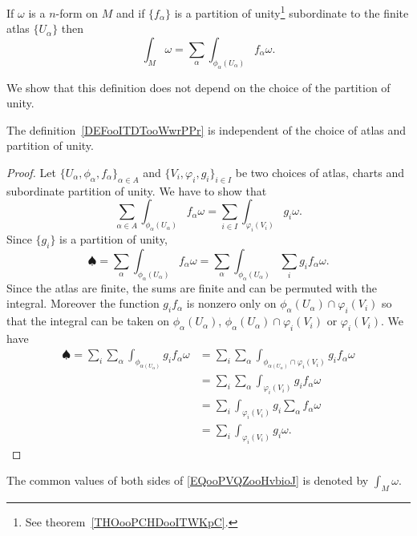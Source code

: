 \begin{definition}      \label{DEFooITDTooWwrPPr}
	If \( \omega\) is a \( n\)-form on \( M\) and if \( \{ f_{\alpha} \} \) is a partition of unity\footnote{See theorem~\ref{THOooPCHDooITWKpC}.} subordinate to the finite atlas \( \{ U_{\alpha} \}\) then
	\begin{equation}
		\int_M\omega=\sum_{\alpha}\int_{\phi_{\alpha}(U_{\alpha})}f_{\alpha}\omega.
	\end{equation}
\end{definition}

We show that this definition does not depend on the choice of the partition of unity.
\begin{lemma} \label{LEMooCMIZooHhHaHV}
	The definition~\ref{DEFooITDTooWwrPPr} is independent of the choice of atlas and partition of unity.
\end{lemma}

\begin{proof}
	Let \(  \{ U_{\alpha},\phi_{\alpha},f_{\alpha} \}_{\alpha\in A}  \) and \( \{ V_i,\varphi_i,g_i \}_{i\in I}\) be two choices of atlas, charts and subordinate partition of unity. We have to show that
	\begin{equation}        \label{EQooPVQZooHvbioJ}
		\sum_{\alpha\in A}\int_{\phi_{\alpha}(U_{\alpha})}f_{\alpha}\omega=\sum_{i\in I}\int_{\varphi_i(V_i)}g_i\omega.
	\end{equation}
	Since \( \{ g_i \}\) is a partition of unity,
	\begin{equation}
		\spadesuit=\sum_{\alpha}\int_{\phi_{\alpha}(U_{\alpha})}f_{\alpha}\omega=\sum_{\alpha}\int_{\phi_{\alpha}(U_{\alpha})}\sum_ig_if_{\alpha}\omega.
	\end{equation}
	Since the atlas are finite, the sums are finite and can be permuted with the integral. Moreover the function \( g_if_{\alpha}\) is nonzero only on \( \phi_{\alpha}(U_{\alpha})\cap\varphi_i(V_i)\) so that the integral can be taken on \( \phi_{\alpha}(U_{\alpha})\), \( \phi_{\alpha}(U_{\alpha})\cap\varphi_i(V_i)\) or \( \varphi_i(V_i)\). We have
	\begin{subequations}
		\begin{align}
			\spadesuit=\sum_i\sum_{\alpha}\int_{\phi_{\alpha(U_{\alpha})}}g_if_{\alpha}\omega & =  \sum_i\sum_{\alpha}\int_{\phi_{\alpha(U_{\alpha})}\cap \varphi_i(V_i)}g_if_{\alpha}\omega \\
			                                                                                  & =  \sum_i\sum_{\alpha}\int_{\varphi_i(V_i)}g_if_{\alpha}\omega                               \\
			                                                                                  & = \sum_i\int_{\varphi_i(V_i)}g_i\sum_{\alpha}f_{\alpha}\omega                                \\
			                                                                                  & =\sum_i\int_{\varphi_i(V_i)}g_i\omega.
		\end{align}
	\end{subequations}
\end{proof}
The common values of both sides of \eqref{EQooPVQZooHvbioJ} is denoted by \( \int_M\omega\).

